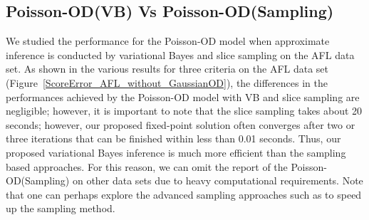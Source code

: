 \subsection{Poisson-OD(VB) Vs Poisson-OD(Sampling)}
\label{sec:VBSampling}
We studied the performance for the Poisson-OD model when approximate inference is conducted by variational Bayes and slice sampling on the AFL data set. As shown in the various results for three criteria on the AFL data set (Figure~\ref{ScoreError_AFL_without_GaussianOD}), the differences in the performances achieved by the Poisson-OD model with VB and slice sampling are negligible; however, it is important to note that the slice sampling takes about 20 seconds; however, our proposed fixed-point solution often converges after two or three iterations that can be finished within less  than 0.01 seconds. Thus, our proposed variational Bayes inference is much more efficient than the sampling based approaches. For this reason, we can omit the report of the Poisson-OD(Sampling) on other data sets due to heavy computational requirements. Note that one can perhaps explore the advanced sampling approaches such as \cite{Murray:AISTATS2010} to speed up the sampling method. 


